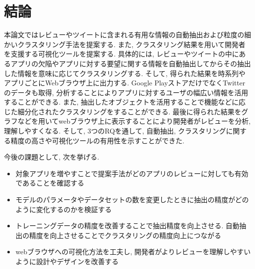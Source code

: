 \chapter{結論}
\label{chap:keturon}

本論文ではレビューやツイートに含まれる有用な情報の自動抽出および粒度の細かいクラスタリング手法を提案する. また, クラスタリング結果を用いて開発者を支援する可視化ツールを提案する. 
具体的には, レビューやツイートの中にあるアプリの欠陥やアプリに対する要望に関する情報を自動抽出してからその抽出した情報を意味に応じてクラスタリングする.  そして, 得られた結果を時系列やアプリごとにWebブラウザ上に出力する.
Google PlayストアだけでなくTwitterのデータも取得, 分析することによりアプリに対するユーザの幅広い情報を活用することができる. また, 抽出したオブジェクトを活用することで機能などに応じた細分化されたクラスタリングをすることができる. 最後に得られた結果をグラフなどを用いてwebブラウザ上に表示することにより開発者がレビューを分析, 理解しやすくなる. 
そして, 3つのRQを通して, 自動抽出, クラスタリングに関する精度の高さや可視化ツールの有用性を示すことができた. 

今後の課題として, 次を挙げる. 

\begin{itemize}
    \item 対象アプリを増やすことで提案手法がどのアプリのレビューに対しても有効であることを確認する
    \item モデルのパラメータやデータセットの数を変更したときに抽出の精度がどのように変化するのかを検証する
    \item トレーニングデータの精度を改善することで抽出精度を向上させる. 自動抽出の精度を向上させることでクラスタリングの精度向上につながる
    \item webブラウザへの可視化方法を工夫し, 開発者がよりレビューを理解しやすいように設計やデザインを改善する
\end{itemize}
